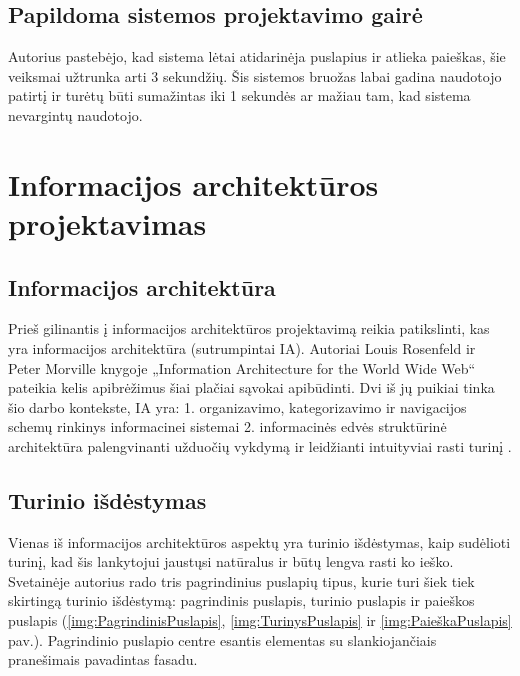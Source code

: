 \documentclass{VUMIFPSbakalaurinis}
\begin{document}
\subsection{Papildoma sistemos projektavimo gairė}
Autorius pastebėjo, kad sistema lėtai atidarinėja puslapius ir atlieka paieškas, šie veiksmai užtrunka arti 3 sekundžių. Šis sistemos bruožas labai gadina naudotojo patirtį ir turėtų būti sumažintas iki 1 sekundės ar mažiau tam, kad sistema nevargintų naudotojo.


\section{Informacijos architektūros projektavimas}
\subsection{Informacijos architektūra}
Prieš gilinantis į informacijos architektūros projektavimą reikia patikslinti, kas yra informacijos architektūra (sutrumpintai IA). Autoriai Louis Rosenfeld ir Peter Morville knygoje „Information Architecture for the World Wide Web“ pateikia kelis apibrėžimus šiai plačiai sąvokai apibūdinti. Dvi iš jų puikiai tinka šio darbo kontekste, IA yra: 1. organizavimo, kategorizavimo ir navigacijos schemų rinkinys informacinei sistemai 2. informacinės edvės struktūrinė architektūra palengvinanti užduočių vykdymą ir leidžianti intuityviai rasti turinį \cite{IADefinition}.

\subsection{Turinio išdėstymas}
Vienas iš informacijos architektūros aspektų yra turinio išdėstymas, kaip sudėlioti turinį, kad šis lankytojui jaustųsi natūralus ir būtų lengva rasti ko ieško. Svetainėje autorius rado tris pagrindinius puslapių tipus, kurie turi šiek tiek skirtingą turinio išdėstymą: pagrindinis puslapis, turinio puslapis ir paieškos puslapis (\ref{img:PagrindinisPuslapis}, \ref{img:TurinysPuslapis} ir \ref{img:PaieškaPuslapis} pav.). Pagrindinio puslapio centre esantis elementas su slankiojančiais pranešimais pavadintas fasadu.
\end{document}
